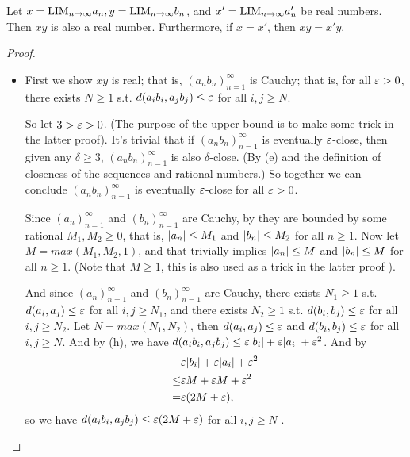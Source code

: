\begin{proposition}  \label{prop 5.3.10}
Let \(x = \text{LIM}_{n \to \infty} a_n, y = \text{LIM}_{n \to \infty} b_n\), and \(x' = \text{LIM}_{n \to \infty} a'_n\) be real numbers.
Then \(xy\) is also a real number.
Furthermore, if \(x = x'\), then \(xy = x'y\). 
\end{proposition}

\begin{proof}
\begin{itemize}
    \item
        First we show \(xy\) is real;
        that is, \((a_n b_n)_{n = 1}^{\infty}\) is Cauchy;
        that is, for all \(\varepsilon > 0\), there exists \(N \ge 1\) s.t. \(d(a_i b_i, a_j b_j) \le \varepsilon\) for all \(i, j \ge N\).
        
        So let \(3 > \varepsilon > 0\). 
        (The purpose of the upper bound is to make some trick in the latter proof).
        It's trivial that if \((a_n b_n)_{n = 1}^{\infty}\) is eventually \(\varepsilon\)-close, then given any \(\delta \ge 3\), \((a_n b_n)_{n = 1}^{\infty}\) is also \(\delta\)-close.
        (By (e) and the definition of closeness of the sequences and rational numbers.)
        So together we can conclude \((a_n b_n)_{n = 1}^{\infty}\) is eventually \(\varepsilon\)-close for all \(\varepsilon > 0\).
        
        Since \((a_n)_{n = 1}^{\infty}\) and \((b_n)_{n = 1}^{\infty}\) are Cauchy, by  they are bounded by some rational \(M_1, M_2 \ge 0\),
        that is, \(\lvert a_n\rvert \le M_1\) and \(\lvert b_n\rvert \le M_2\) for all \(n \ge 1\).
        Now let \(M = max(M_1, M_2, 1)\), and that trivially implies \(\lvert a_n\rvert \le M\)  and \(\lvert b_n\rvert \le M\)  for all \(n \ge 1\).
        (Note that \(M \ge 1\), this is also used as a trick in the latter proof ).
        
        And since \((a_n)_{n = 1}^{\infty}\) and \((b_n)_{n = 1}^{\infty}\) are Cauchy, there exists \(N_1 \ge 1\) s.t. \(d(a_i , a_j) \le \varepsilon\) for all \(i, j \ge N_1\),
        and there exists \(N_2 \ge 1\) s.t. \(d(b_i , b_j) \le \varepsilon\) for all \(i, j \ge N_2\).
        Let \(N = max(N_1, N_2)\), then \(d(a_i , a_j) \le \varepsilon\) and \(d(b_i, b_j)\le \varepsilon\) for all \(i, j \ge N\).
        And by (h), we have \(d(a_i b_i, a_j b_j) \le \varepsilon\lvert b_i\rvert + \varepsilon\lvert a_i\rvert + \varepsilon^2\).
        And by 
        \begin{align*}
                & \varepsilon\lvert b_i\rvert + \varepsilon\lvert a_i\rvert + \varepsilon^2 \\
            \le &  \varepsilon M + \varepsilon M + \varepsilon^2 \\
              = & \varepsilon(2M + \varepsilon),
        \end{align*}
        so we have \(d(a_i b_i, a_j b_j) \le \varepsilon(2M + \varepsilon)\) for all \(i, j \ge N\) .
        

\end{itemize}
\end{proof}
